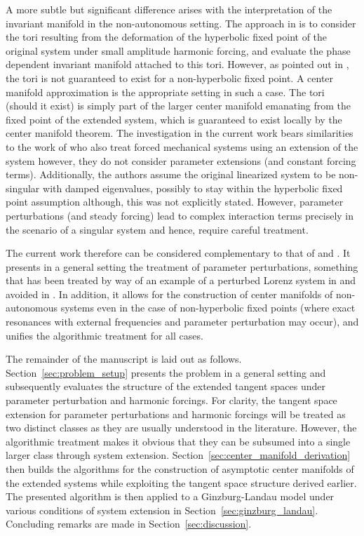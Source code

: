 A more subtle but significant difference arises with the interpretation of the invariant manifold in the non-autonomous setting. The approach in \cite{jain22} is to consider the tori resulting from the deformation of the hyperbolic fixed point of the original system under small amplitude harmonic forcing, and evaluate the phase dependent invariant manifold attached to this tori. However, as pointed out in \cite{jain22}, the tori is not guaranteed to exist for a non-hyperbolic fixed point. A center manifold approximation is the appropriate setting in such a case. The tori (should it exist) is simply part of the larger center manifold emanating from the fixed point of the extended system, which is guaranteed to exist locally by the center manifold theorem. The investigation in the current work bears similarities to the work of \citet{vizzaccaro24} who also treat forced mechanical systems using an extension of the system however, they do not consider parameter extensions (and constant forcing terms). Additionally, the authors assume the original linearized system to be non-singular with damped eigenvalues, possibly to stay within the hyperbolic fixed point assumption although, this was not explicitly stated. However, parameter perturbations (and steady forcing) lead to complex interaction terms precisely in the scenario of a singular system and hence, require careful treatment. 

The current work therefore can be considered complementary to that of \cite{jain22} and \cite{vizzaccaro24}. It presents in a general setting the treatment of parameter perturbations, something that has been treated by way of an example of a perturbed Lorenz system in \cite{jain22} and avoided in \cite{vizzaccaro24}. In addition, it allows for the construction of center manifolds of non-autonomous systems even in the case of non-hyperbolic fixed points (where exact resonances with external frequencies and parameter perturbation may occur),
and unifies the algorithmic treatment for all cases.  

The remainder of the manuscript is laid out as follows. Section~\ref{sec:problem_setup} presents the problem in a general setting and subsequently evaluates the structure of the extended tangent spaces under parameter perturbation and harmonic forcings. For clarity, the tangent space extension for parameter perturbations and harmonic forcings will be treated as two distinct classes as they are usually understood in the literature. However, the algorithmic treatment makes it obvious that they can be subsumed into a single larger class through system extension. Section~\ref{sec:center_manifold_derivation} then builds the algorithms for the construction of asymptotic center manifolds of the extended systems while exploiting the tangent space structure derived earlier. The presented algorithm is then applied to a Ginzburg-Landau model under various conditions of system extension in Section~\ref{sec:ginzburg_landau}. Concluding remarks are made in Section~\ref{sec:discussion}.










